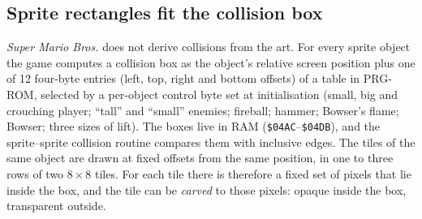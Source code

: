 \documentclass{article}
\newcommand{\hex}[1]{\texttt{\$#1}}
\begin{document}
\subsection{Sprite rectangles fit the collision box}
\label{sec:hitbox}

\textit{Super Mario Bros.} does not derive collisions from the art. For every sprite object the
game computes a collision box as the object's relative screen position plus one of 12 four-byte
entries (left, top, right and bottom offsets) of a table in PRG-ROM, selected by a per-object
control byte set at initialisation (small, big and crouching player; ``tall'' and ``small''
enemies; fireball; hammer; Bowser's flame; Bowser; three sizes of lift). The boxes live in RAM
(\hex{04AC}--\hex{04DB}), and the sprite--sprite collision routine compares them with inclusive
edges. The tiles of the same object are drawn at fixed offsets from the same position, in one to
three rows of two $8\times8$ tiles. For each tile there is therefore a fixed set of pixels that
lie inside the box, and the tile can be \emph{carved} to those pixels: opaque inside the box,
transparent outside.
\end{document}
